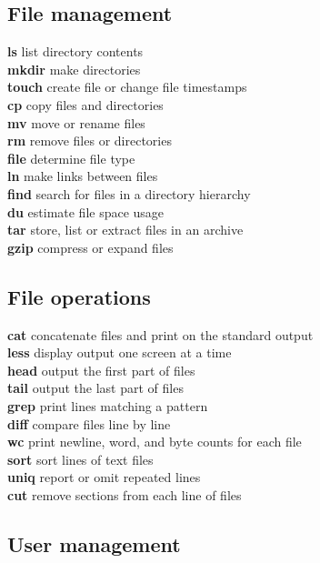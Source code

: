 \documentclass[11pt]{article}
\newcommand{\command}[2]{\textsf{\textbf{#1}} \dotfill{} #2}
\begin{document}
\begin{multicols*}{2}
\subsection{File management}

\command{ls}{list directory contents}\\
\command{mkdir}{make directories}\\
\command{touch}{create file or change file timestamps}\\
\command{cp}{copy files and directories}\\
\command{mv}{move or rename files}\\
\command{rm}{remove files or directories}\\
\command{file}{determine file type}\\
\command{ln}{make links between files}\\
\command{find}{search for files in a directory hierarchy}\\
\command{du}{estimate file space usage}\\
\command{tar}{store, list or extract files in an archive}\\
\command{gzip}{compress or expand files}

\subsection{File operations}

\command{cat}{concatenate files and print on the standard output}\\
\command{less}{display output one screen at a time}\\
\command{head}{output the first part of files}\\
\command{tail}{output the last part of files}\\
\command{grep}{print lines matching a pattern}\\
\command{diff}{compare files line by line}\\
\command{wc}{print newline, word, and byte counts for each file}\\
\command{sort}{sort lines of text files}\\
\command{uniq}{report or omit repeated lines}\\
\command{cut}{remove sections from each line of files}

\subsection{User management}


\end{multicols*}
\end{document}
